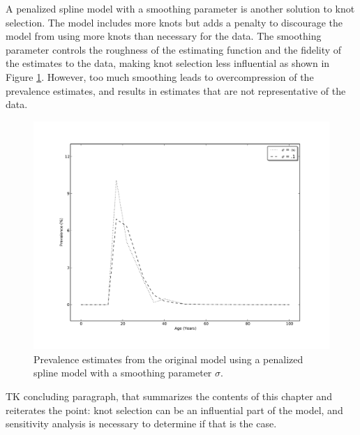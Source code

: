 A penalized spline model with a smoothing parameter is another
solution to knot selection.  The model includes more knots but adds a
penalty to discourage the model from using more knots than necessary
for the data.  The smoothing parameter controls the roughness of the
estimating function and the fidelity of the estimates to the data,
making knot selection less influential as shown in Figure
\ref{fig:app-cannabis_smoothing}.  However, too much smoothing leads
to overcompression of the prevalence estimates, and results in
estimates that are not representative of the data.

    \begin{figure}[h]
        \begin{center}
            \includegraphics[width=\textwidth]{applications/cannabis_dependence-smoothing.pdf}
            \caption{Prevalence estimates from the original model
              using a penalized spline model with a smoothing
              parameter $\sigma$. }
        \label{fig:app-cannabis_smoothing}
        \end{center}
    \end{figure}

TK concluding paragraph, that summarizes the contents of this chapter
and reiterates the point: knot selection can be an influential part of
the model, and sensitivity analysis is necessary to determine if that
is the case.
